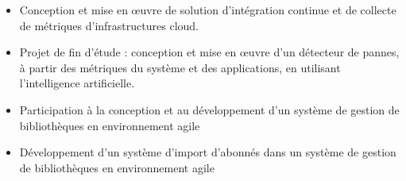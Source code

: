 \documentclass[11pt, a4paper, ragged2e]{altacv}
\begin{document}

\begin{fullwidth}
\makecvheader
\end{fullwidth}




\begin{itemize}
    \item Conception et mise en \oe{}uvre de solution d’intégration continue et de collecte de métriques d’infrastructures cloud.
    \item Projet de fin d'étude : conception et mise en \oe{}uvre d'un détecteur de pannes, à partir des métriques du système et des applications, en utilisant l'intelligence artificielle. 
\end{itemize}
\divider

\begin{itemize}
    \item Participation à la conception et au développement d'un système de gestion de bibliothèques en environnement agile
\end{itemize}
\divider

\begin{itemize}
    \item Développement d’un système d’import d’abonnés dans un système de gestion de bibliothèques en environnement agile
\end{itemize}
\divider
\end{document}
